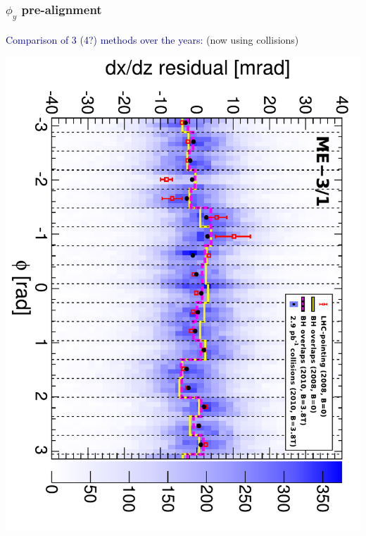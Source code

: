 \documentclass[compress]{beamer}
\begin{document}
\begin{frame}
\frametitle{$\phi_y$ pre-alignment}

\textcolor{darkblue}{Comparison of 3 (4?) methods over the years:} \hfill (now using collisions)

\includegraphics[height=0.9\linewidth, angle=90]{mem3phiy_all.pdf}
\end{frame}
\end{document}
